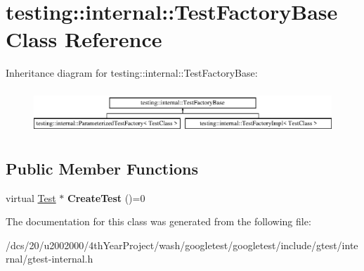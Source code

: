\hypertarget{classtesting_1_1internal_1_1TestFactoryBase}{}\section{testing\+:\+:internal\+:\+:Test\+Factory\+Base Class Reference}
\label{classtesting_1_1internal_1_1TestFactoryBase}
Inheritance diagram for testing\+:\+:internal\+:\+:Test\+Factory\+Base\+:\begin{figure}[H]
\begin{center}
\leavevmode
\includegraphics[height=1.666667cm]{classtesting_1_1internal_1_1TestFactoryBase}
\end{center}
\end{figure}
\subsection*{Public Member Functions}
\begin{DoxyCompactItemize}
\item 
\mbox{\label{classtesting_1_1internal_1_1TestFactoryBase_a07ac3ca0b196cdb092da0bb186b7c030}} 
virtual \mbox{\hyperlink{classtesting_1_1Test}{Test}} $\ast$ {\bfseries Create\+Test} ()=0
\end{DoxyCompactItemize}


The documentation for this class was generated from the following file\+:\begin{DoxyCompactItemize}
\item 
/dcs/20/u2002000/4th\+Year\+Project/wash/googletest/googletest/include/gtest/internal/gtest-\/internal.\+h\end{DoxyCompactItemize}
